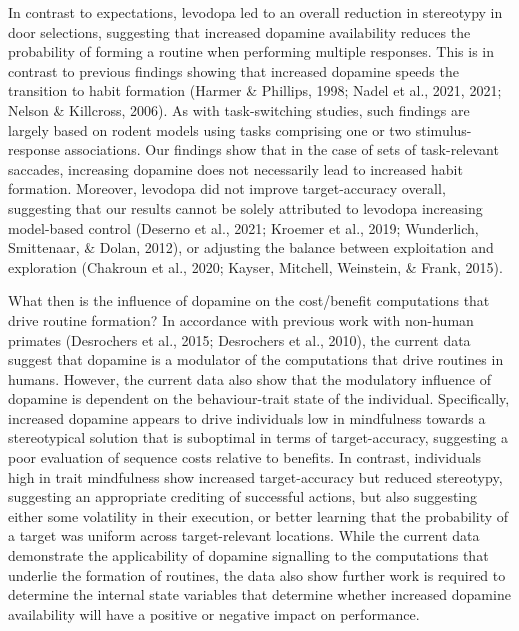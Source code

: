 \documentclass[
  man]{apa6}
\begin{document}
In contrast to expectations, levodopa led to an overall reduction in stereotypy in door selections, suggesting that increased dopamine availability reduces the probability of forming a routine when performing multiple responses. This is in contrast to previous findings showing that increased dopamine speeds the transition to habit formation (Harmer \& Phillips, 1998; Nadel et al., 2021, 2021; Nelson \& Killcross, 2006). As with task-switching studies, such findings are largely based on rodent models using tasks comprising one or two stimulus-response associations. Our findings show that in the case of sets of task-relevant saccades, increasing dopamine does not necessarily lead to increased habit formation. Moreover, levodopa did not improve target-accuracy overall, suggesting that our results cannot be solely attributed to levodopa increasing model-based control (Deserno et al., 2021; Kroemer et al., 2019; Wunderlich, Smittenaar, \& Dolan, 2012), or adjusting the balance between exploitation and exploration (Chakroun et al., 2020; Kayser, Mitchell, Weinstein, \& Frank, 2015).

What then is the influence of dopamine on the cost/benefit computations that drive routine formation? In accordance with previous work with non-human primates (Desrochers et al., 2015; Desrochers et al., 2010), the current data suggest that dopamine is a modulator of the computations that drive routines in humans. However, the current data also show that the modulatory influence of dopamine is dependent on the behaviour-trait state of the individual. Specifically, increased dopamine appears to drive individuals low in mindfulness towards a stereotypical solution that is suboptimal in terms of target-accuracy, suggesting a poor evaluation of sequence costs relative to benefits. In contrast, individuals high in trait mindfulness show increased target-accuracy but reduced stereotypy, suggesting an appropriate crediting of successful actions, but also suggesting either some volatility in their execution, or better learning that the probability of a target was uniform across target-relevant locations. While the current data demonstrate the applicability of dopamine signalling to the computations that underlie the formation of routines, the data also show further work is required to determine the internal state variables that determine whether increased dopamine availability will have a positive or negative impact on performance.
\end{document}
